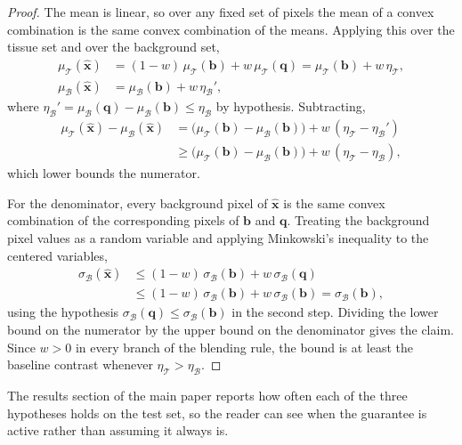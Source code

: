 \begin{proof}
The mean is linear, so over any fixed set of pixels the mean of a convex combination is the same
convex combination of the means. Applying this over the tissue set and over the background set,
\begin{align*}
\mu_\mathcal{T}(\hat{\mathbf{x}}) &= (1-w)\,\mu_\mathcal{T}(\mathbf{b}) + w\,\mu_\mathcal{T}(\mathbf{q})
 = \mu_\mathcal{T}(\mathbf{b}) + w\,\eta_\mathcal{T}, \\
\mu_\mathcal{B}(\hat{\mathbf{x}}) &= \mu_\mathcal{B}(\mathbf{b}) + w\,\eta_\mathcal{B}',
\end{align*}
where $\eta_\mathcal{B}' = \mu_\mathcal{B}(\mathbf{q}) - \mu_\mathcal{B}(\mathbf{b}) \le \eta_\mathcal{B}$
by hypothesis. Subtracting,
\begin{equation*}
\begin{split}
\mu_\mathcal{T}(\hat{\mathbf{x}}) - \mu_\mathcal{B}(\hat{\mathbf{x}})
&= \big(\mu_\mathcal{T}(\mathbf{b}) - \mu_\mathcal{B}(\mathbf{b})\big) + w\,(\eta_\mathcal{T} - \eta_\mathcal{B}') \\
&\ge \big(\mu_\mathcal{T}(\mathbf{b}) - \mu_\mathcal{B}(\mathbf{b})\big) + w\,(\eta_\mathcal{T} - \eta_\mathcal{B}),
\end{split}
\end{equation*}
which lower bounds the numerator.

For the denominator, every background pixel of $\hat{\mathbf{x}}$ is the same convex combination of
the corresponding pixels of $\mathbf{b}$ and $\mathbf{q}$. Treating the background pixel values as a
random variable and applying Minkowski's inequality to the centered variables,
\begin{equation*}
\begin{split}
\sigma_\mathcal{B}(\hat{\mathbf{x}}) &\le (1-w)\,\sigma_\mathcal{B}(\mathbf{b}) + w\,\sigma_\mathcal{B}(\mathbf{q}) \\
&\le (1-w)\,\sigma_\mathcal{B}(\mathbf{b}) + w\,\sigma_\mathcal{B}(\mathbf{b}) = \sigma_\mathcal{B}(\mathbf{b}),
\end{split}
\end{equation*}
using the hypothesis $\sigma_\mathcal{B}(\mathbf{q}) \le \sigma_\mathcal{B}(\mathbf{b})$ in the second
step. Dividing the lower bound on the numerator by the upper bound on the denominator gives the
claim. Since $w > 0$ in every branch of the blending rule, the bound is at least the baseline
contrast whenever $\eta_\mathcal{T} > \eta_\mathcal{B}$.
\end{proof}

\noindent The results section of the main paper reports how often each of the three hypotheses holds on the
test set, so the reader can see when the guarantee is active rather than assuming it always is.
